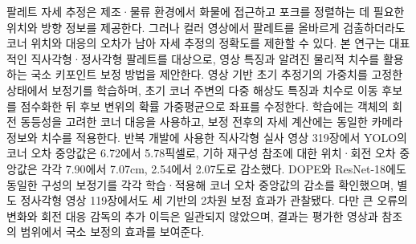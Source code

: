 팔레트 자세 추정은 제조·물류 환경에서 화물에 접근하고 포크를 정렬하는 데 필요한 위치와 방향 정보를 제공한다.
그러나 컬러 영상에서 팔레트를 올바르게 검출하더라도 코너 위치와 대응의 오차가 남아 자세 추정의 정확도를 제한할 수 있다.
본 연구는 대표적인 직사각형·정사각형 팔레트를 대상으로, 영상 특징과 알려진 물리적 치수를 활용하는 국소 키포인트 보정 방법을 제안한다.
영상 기반 초기 추정기의 가중치를 고정한 상태에서 보정기를 학습하며, 초기 코너 주변의 다중 해상도 특징과 치수로 이동 후보를 점수화한 뒤 후보 변위의 확률 가중평균으로 좌표를 수정한다.
학습에는 객체의 회전 동등성을 고려한 코너 대응을 사용하고, 보정 전후의 자세 계산에는 동일한 카메라 정보와 치수를 적용한다.
반복 개발에 사용한 직사각형 실사 영상 319장에서 YOLO의 코너 오차 중앙값은 6.72에서 5.78픽셀로, 기하 재구성 참조에 대한 위치·회전 오차 중앙값은 각각 7.90에서 7.07cm, 2.54에서 2.07도로 감소했다.
DOPE와 ResNet-18에도 동일한 구성의 보정기를 각각 학습·적용해 코너 오차 중앙값의 감소를 확인했으며, 별도 정사각형 영상 119장에서도 세 기반의 2차원 보정 효과가 관찰됐다.
다만 큰 오류의 변화와 회전 대응 감독의 추가 이득은 일관되지 않았으며, 결과는 평가한 영상과 참조의 범위에서 국소 보정의 효과를 보여준다.
